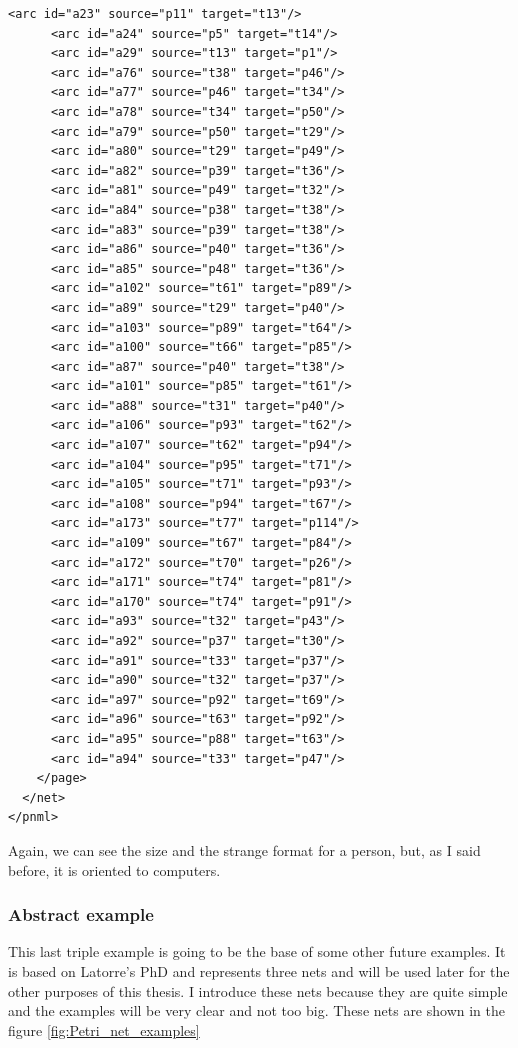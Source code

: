 \begin{multicols}{2}
\begin{lstlisting}[basicstyle=\ttfamily\tiny]
      <arc id="a23" source="p11" target="t13"/>
      <arc id="a24" source="p5" target="t14"/>
      <arc id="a29" source="t13" target="p1"/>
      <arc id="a76" source="t38" target="p46"/>
      <arc id="a77" source="p46" target="t34"/>
      <arc id="a78" source="t34" target="p50"/>
      <arc id="a79" source="p50" target="t29"/>
      <arc id="a80" source="t29" target="p49"/>
      <arc id="a82" source="p39" target="t36"/>
      <arc id="a81" source="p49" target="t32"/>
      <arc id="a84" source="p38" target="t38"/>
      <arc id="a83" source="p39" target="t38"/>
      <arc id="a86" source="p40" target="t36"/>
      <arc id="a85" source="p48" target="t36"/>
      <arc id="a102" source="t61" target="p89"/>
      <arc id="a89" source="t29" target="p40"/>
      <arc id="a103" source="p89" target="t64"/>
      <arc id="a100" source="t66" target="p85"/>
      <arc id="a87" source="p40" target="t38"/>
      <arc id="a101" source="p85" target="t61"/>
      <arc id="a88" source="t31" target="p40"/>
      <arc id="a106" source="p93" target="t62"/>
      <arc id="a107" source="t62" target="p94"/>
      <arc id="a104" source="p95" target="t71"/>
      <arc id="a105" source="t71" target="p93"/>
      <arc id="a108" source="p94" target="t67"/>
      <arc id="a173" source="t77" target="p114"/>
      <arc id="a109" source="t67" target="p84"/>
      <arc id="a172" source="t70" target="p26"/>
      <arc id="a171" source="t74" target="p81"/>
      <arc id="a170" source="t74" target="p91"/>
      <arc id="a93" source="t32" target="p43"/>
      <arc id="a92" source="p37" target="t30"/>
      <arc id="a91" source="t33" target="p37"/>
      <arc id="a90" source="t32" target="p37"/>
      <arc id="a97" source="p92" target="t69"/>
      <arc id="a96" source="t63" target="p92"/>
      <arc id="a95" source="p88" target="t63"/>
      <arc id="a94" source="t33" target="p47"/>
    </page>
  </net>
</pnml>
\end{lstlisting}
\end{multicols}

Again,  we can see the size and the strange format for a person, but, as I
said before, it is oriented to computers.

\subsubsection{Abstract example}
This last triple example is going to be the base of some other future examples.
It is based on Latorre's PhD \cite{G-Latorre2012PhD} and represents three nets and will be used later for the other purposes of this thesis.
I introduce these nets because they are quite simple and  the examples will
be very clear and not too big.
These nets are shown in the figure \ref{fig:Petri_net_examples}   

